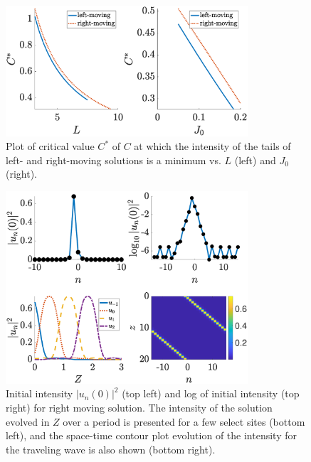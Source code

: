 \documentclass[reprint, amsmath,amssymb,aps,pre]{revtex4-2}
\begin{document}
\begin{figure}
    \centering
    \includegraphics[width=9cm]{Cstar.eps}
    \caption{Plot of critical value $C^*$ of $C$ at which the intensity of the 
    tails of left- and right-moving solutions is a minimum vs. $L$ (left) and $J_0$ (right).} %
    \label{fig:Cstar}
\end{figure}

\begin{figure}
    \centering
    \includegraphics[width=9cm]{rightsol.eps}
    \caption{Initial intensity $|u_n(0)|^2$ (top left) and log of initial intensity (top right) for right moving solution. The intensity of the solution evolved in $Z$ over a period is presented for a few select sites (bottom left), and the space-time contour 
    plot evolution of the intensity for the traveling wave is also shown (bottom right).}
    \label{fig:rightsol}
\end{figure}
\end{document}
